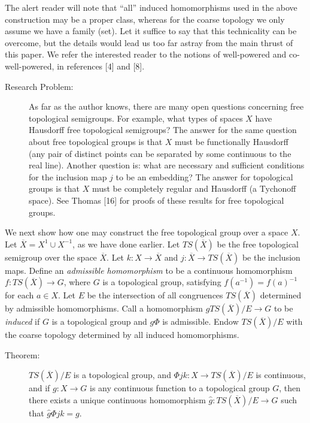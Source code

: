 \documentclass{article}
\begin{document}
The alert reader will note that ``all'' induced homomorphisms used in the above construction may be a proper class, whereas for the coarse topology we only assume we have a family (set). Let it suffice to say that this technicality can be overcome, but the details would lead us too far astray from the main thrust of this paper. We refer the interested reader to the notions of well-powered and co-well-powered, in references [4] and [8].

\begin{description}

\item[Research Problem:] As far as the author knows, there are many open questions concerning free topological semigroups. For example, what types of spaces $X$ have Hausdorff free topological semigroups? The answer for the same question about free topological groups is that $X$ must be functionally Hausdorff (any pair of distinct points can be separated by some continuous to the real line). Another question is: what are necessary and sufficient conditions for the inclusion map $j$ to be an embedding? The answer for topological groups is that $X$ must be completely regular and Hausdorff (a Tychonoff space). See Thomas [16] for proofs of these results for free topological groups.

\end{description}

We next show how one may construct the free topological group over a space $X$. Let $\overline{X} = X^1 \cup X^{-1}$, as we have done earlier. Let $TS(\overline{X})$ be the free topological semigroup over the space $\overline{X}$. Let $k: X \rightarrow \overline{X}$ and $j: \overline{X} \rightarrow TS(\overline{X})$ be the inclusion maps. Define an \emph{admissible homomorphism} to be a continuous homomorphism $f: TS(\overline{X}) \rightarrow G$, where $G$ is a topological group, satisfying $f(a^{-1}) = f(a)^{-1}$ for each $a \in X$. Let $E$ be the intersection of all congruences $TS(\overline{X})$ determined by admissible homomorphisms. Call a homomorphism $gTS(\overline{X})/E \rightarrow G$ to be \emph{induced} if $G$ is a topological group and $g \Phi$ is admissible. Endow $TS(\overline{X})/E$ with the coarse topology determined by all induced homomorphisms.

\begin{description}

\item[Theorem:] $TS(\overline{X})/E$ is a topological group, and $\Phi jk: X \rightarrow TS(\overline{X})/E$ is continuous, and if $g: X \rightarrow G$ is any continuous function to a topological group $G$, then there exists a unique continuous homomorphism $\hat{g}: TS(\overline{X})/E \rightarrow G$ such that $\hat{g} \Phi jk = g$.

\end{description}
\end{document}

